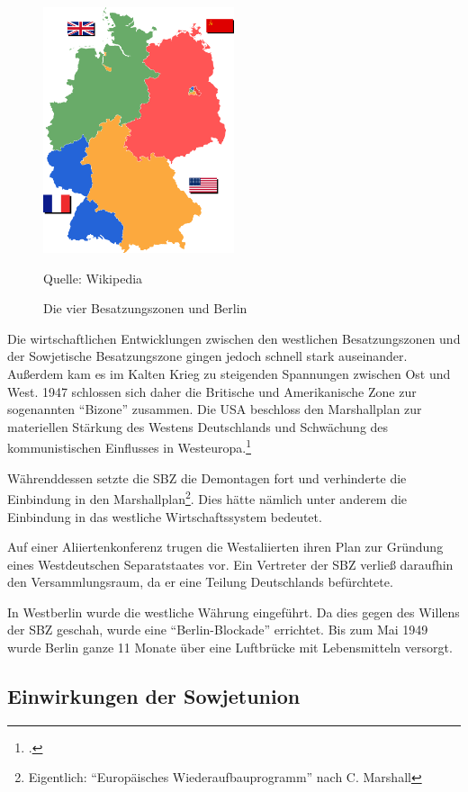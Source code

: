 \documentclass[12pt,a4paper]{article}
\begin{document}
\begin{figure}[h]
	\centering
	\includegraphics[width=0.5\textwidth]{Bilder/Besatzungszonen.png}
	\caption{Die vier Besatzungszonen und Berlin}
	Quelle: Wikipedia
	\label{img:besatzungszonen}
\end{figure}

Die wirtschaftlichen Entwicklungen zwischen den westlichen Besatzungszonen und der Sowjetische Besatzungszone gingen jedoch schnell stark auseinander. Außerdem kam es im Kalten Krieg zu steigenden Spannungen zwischen Ost und West.
1947 schlossen sich daher die Britische und Amerikanische Zone zur sogenannten \enquote{Bizone} zusammen. Die USA beschloss den Marshallplan zur materiellen Stärkung des Westens Deutschlands und Schwächung des kommunistischen Einflusses in Westeuropa.\footcite{izpb:weg-diktatur} 

Währenddessen setzte die SBZ die Demontagen fort und verhinderte die Einbindung in den Marshallplan\footnote{Eigentlich: \enquote{Europäisches Wiederaufbauprogramm} nach C. Marshall}. Dies hätte nämlich unter anderem die Einbindung in das westliche Wirtschaftssystem bedeutet.

Auf einer Aliiertenkonferenz trugen die Westaliierten ihren Plan zur Gründung eines Westdeutschen Separatstaates vor. Ein Vertreter der SBZ verließ daraufhin den Versammlungsraum, da er eine Teilung Deutschlands befürchtete.

In Westberlin wurde die westliche Währung eingeführt. Da dies gegen des Willens der SBZ geschah, wurde eine \enquote{Berlin-Blockade} errichtet. Bis zum Mai 1949 wurde Berlin ganze 11 Monate über eine Luftbrücke mit Lebensmitteln versorgt.


\subsection{Einwirkungen der Sowjetunion}
\label{aufteilung:einwirkungen-udssr}
\end{document}
